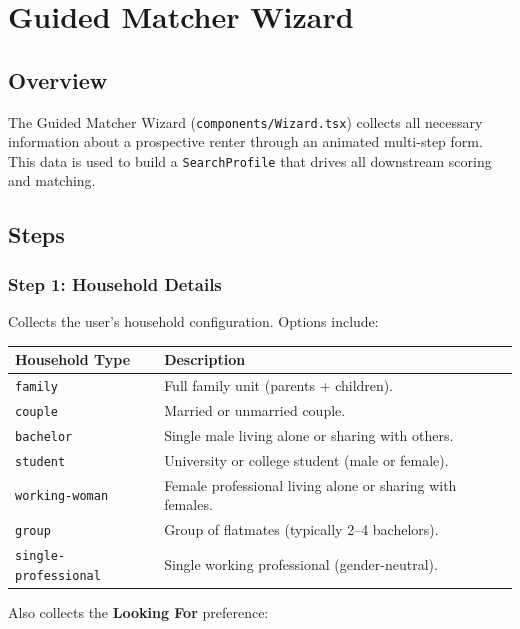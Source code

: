 \documentclass[12pt, a4paper, oneside]{report}
\newcommand{\filepath}[1]{\texttt{\small\color{codeblue}#1}}
\newcommand{\typename}[1]{\texttt{\small\color{codeblue}#1}}
\begin{document}
\chapter{Guided Matcher Wizard}

\section{Overview}

The Guided Matcher Wizard (\filepath{components/Wizard.tsx}) collects all necessary information about a prospective renter through an animated multi-step form. This data is used to build a \typename{SearchProfile} that drives all downstream scoring and matching.

\section{Steps}

\subsection{Step 1: Household Details}

Collects the user's household configuration. Options include:

\begin{longtable}{p{4cm} p{9cm}}
\toprule
\textbf{Household Type} & \textbf{Description} \\
\midrule
\endhead
\texttt{family} & Full family unit (parents + children). \\
\texttt{couple} & Married or unmarried couple. \\
\texttt{bachelor} & Single male living alone or sharing with others. \\
\texttt{student} & University or college student (male or female). \\
\texttt{working-woman} & Female professional living alone or sharing with females. \\
\texttt{group} & Group of flatmates (typically 2--4 bachelors). \\
\texttt{single-professional} & Single working professional (gender-neutral). \\
\bottomrule
\end{longtable}

Also collects the \textbf{Looking For} preference:
\end{document}
